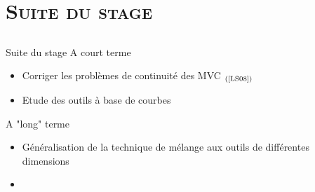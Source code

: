 \documentclass[xcolor=x11names,compress]{beamer}
\renewcommand{\(}{\begin{columns}} \renewcommand{\)}{\end{columns}}
\newcommand{\<}[1]{\begin{column}{#1}} \renewcommand{\>}{\end{column}}
\begin{document}
\section{\scshape Suite du stage}
\subsection{}
\begin{frame}{Suite du stage}
  A court terme
  \begin{itemize}
  \item Corriger les problèmes de continuité des MVC
    $_{(\text{\cite{LS08}})}$
  \item Etude des outils à base de courbes
  \end{itemize}
  A "long" terme
  \begin{itemize}
  \item Généralisation de la technique de mélange aux outils de
    différentes dimensions
  \item
  \end{itemize}
\end{frame}

\appendix
\end{document}
